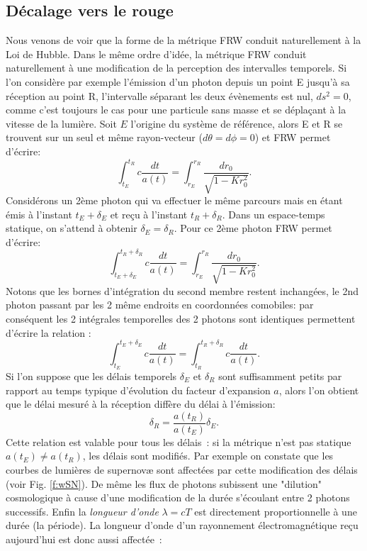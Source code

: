\subsection{Décalage vers le rouge}
Nous venons de voir que la forme de la métrique FRW conduit naturellement à la Loi de Hubble. Dans le même ordre d'idée, la métrique FRW conduit naturellement à une modification de la perception des intervalles temporels. Si l'on considère par exemple l'émission d'un photon depuis un point E jusqu'à sa réception au point R, l'intervalle séparant les deux évènements est nul, $ds^2=0$, comme c'est toujours le cas pour une particule sans masse et se déplaçant à la vitesse de la lumière. Soit $E$ l'origine du système de référence, alors E et R se trouvent sur un seul et même rayon-vecteur ($d\theta=d\phi=0$) et FRW permet d'écrire:
\begin{equation}
\int_{t_E}^{t_R}c\frac{dt}{a(t)}=\int_{r_E}^{r_R}\frac{ dr_0}{\sqrt{1-Kr_0^2}}.
\end{equation}
Considérons un 2ème photon qui va effectuer le même parcours mais en étant émis à l'instant $t_E+\delta_E$ et reçu à l'instant $t_R+\delta_R$. Dans un espace-temps statique, on s'attend à obtenir $\delta_E=\delta_R$. Pour ce 2ème photon FRW permet d'écrire:
\begin{equation}
\int_{t_E+\delta_E}^{t_R+\delta_R}c\frac{dt}{a(t)}=\int_{r_E}^{r_R}\frac{ dr_0}{\sqrt{1-Kr_0^2}}.
\end{equation}
Notons que les bornes d'intégration du second membre restent inchangées, le 2nd photon passant par les 2 même endroits en coordonnées comobiles: par conséquent les 2 intégrales temporelles des 2 photons sont identiques permettent d'écrire la relation :
\begin{equation}
\int_{t_E}^{t_E+\delta_E}c\frac{dt}{a(t)}=\int_{t_R}^{t_R+\delta_R}c\frac{dt}{a(t)}.
\end{equation}
Si l'on suppose que les délais temporels $\delta_E$ et $\delta_R$ sont suffisamment petits par rapport au temps typique d'évolution du facteur d'expansion $a$, alors l'on obtient que le délai mesuré à la réception diffère du délai à l'émission:
\begin{equation}
\delta_R=\frac{a(t_R)}{a(t_E)} \delta_E.
\end{equation}
Cette relation est valable pour tous les délais~: si la métrique n'est pas statique $a(t_E)\neq a(t_R)$, les délais sont modifiés. Par exemple on constate que les courbes de lumières de supernovæ sont affectées par cette modification des délais (voir Fig. \ref{f:wSN}). De même les flux de photons subissent une "dilution" cosmologique à cause d'une modification de la durée s'écoulant entre 2 photons successifs. Enfin la \textit{longueur d'onde} $\lambda=cT$ est directement proportionnelle à une durée (la période). La longueur d'onde d'un rayonnement électromagnétique reçu aujourd'hui est donc aussi affectée~:
